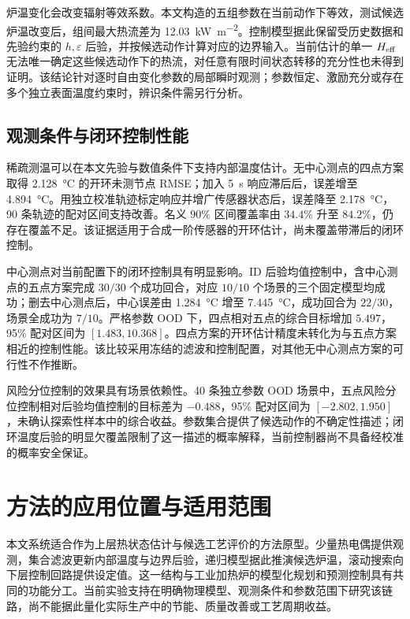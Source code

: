 炉温变化会改变辐射等效系数。本文构造的五组参数在当前动作下等效，测试候选炉温改变后，组间最大热流差为 \SI{12.03}{\kilo\watt\per\square\metre}。控制模型据此保留受历史数据和先验约束的 $h,\varepsilon$ 后验，并按候选动作计算对应的边界输入。当前估计的单一 ${H_{\mathrm{eff}}}$ 无法唯一确定这些候选动作下的热流，对任意有限时间状态转移的充分性也未得到证明。该结论针对逐时自由变化参数的局部瞬时观测；参数恒定、激励充分或存在多个独立表面温度约束时，辨识条件需另行分析。

\subsection{观测条件与闭环控制性能}

稀疏测温可以在本文先验与数值条件下支持内部温度估计。无中心测点的四点方案取得 \SI{2.128}{\degreeCelsius} 的开环未测节点 RMSE；加入 \SI{5}{\second} 响应滞后后，误差增至 \SI{4.894}{\degreeCelsius}。用独立校准轨迹标定响应并增广传感器状态后，误差降至 \SI{2.178}{\degreeCelsius}，90 条轨迹的配对区间支持改善。名义 $90\%$ 区间覆盖率由 $34.4\%$ 升至 $84.2\%$，仍存在覆盖不足。该证据适用于合成一阶传感器的开环估计，尚未覆盖带滞后的闭环控制。

中心测点对当前配置下的闭环控制具有明显影响。ID 后验均值控制中，含中心测点的五点方案完成 $30/30$ 个成功回合，对应 $10/10$ 个场景的三个固定模型均成功；删去中心测点后，中心误差由 \SI{1.284}{\degreeCelsius} 增至 \SI{7.445}{\degreeCelsius}，成功回合为 $22/30$，场景全成功为 $7/10$。严格参数 OOD 下，四点相对五点的综合目标增加 $5.497$，95\% 配对区间为 $[1.483,10.368]$。四点方案的开环估计精度未转化为与五点方案相近的控制性能。该比较采用冻结的滤波和控制配置，对其他无中心测点方案的可行性不作推断。

风险分位控制的效果具有场景依赖性。40 条独立参数 OOD 场景中，五点风险分位控制相对后验均值控制的目标差为 $-0.488$，95\% 配对区间为 $[-2.802,1.950]$，未确认探索性样本中的综合收益。参数集合提供了候选动作的不确定性描述；闭环温度后验的明显欠覆盖限制了这一描述的概率解释，当前控制器尚不具备经校准的概率安全保证。

\section{方法的应用位置与适用范围}

本文系统适合作为上层热状态估计与候选工艺评价的方法原型。少量热电偶提供观测，集合滤波更新内部温度与边界后验，递归模型据此推演候选炉温，滚动搜索向下层控制回路提供设定值。这一结构与工业加热炉的模型化规划和预测控制具有共同的功能分工\cite{steinboeck2011trajectory,steinboeck2013nmpc,yi2017tracking}。当前实验支持在明确物理模型、观测条件和参数范围下研究该链路，尚不能据此量化实际生产中的节能、质量改善或工艺周期收益。

